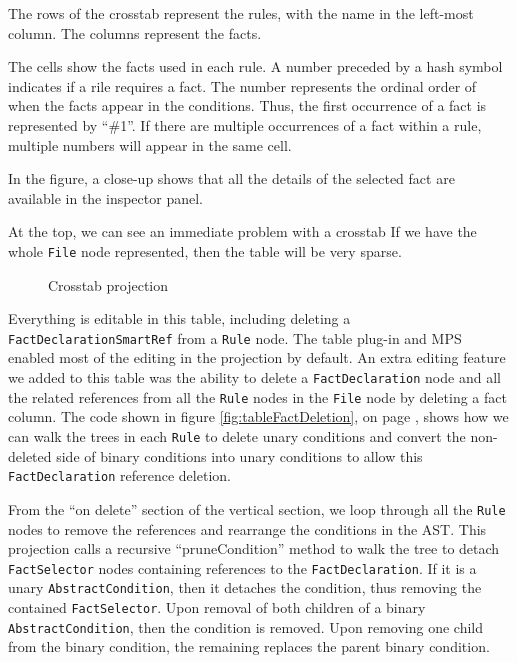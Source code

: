 The rows of the crosstab represent the rules, with the name in the left-most column.
The columns represent the facts.

The cells show the facts used in each rule.
A number preceded by a hash symbol indicates if a rile requires a fact.
The number represents the ordinal order of when the facts appear in the conditions.
Thus, the first occurrence of a fact is represented by ``\#1''.
If there are multiple occurrences of a fact within a rule, multiple numbers will appear in the same cell.

In the figure, a close-up shows that all the details of the selected fact are available in the inspector panel.

At the top, we can see an immediate problem with a crosstab
If we have the whole \texttt{File} node represented, then the table will be very sparse.

\begin{figure}
    \centering
    \caption{Crosstab projection}
    \label{fig:crosstabProjection1}
\end{figure}

Everything is editable in this table, including deleting a \texttt{FactDeclarationSmartRef} from a \texttt{Rule} node.
The table plug-in and MPS enabled most of the editing in the projection by default.
An extra editing feature we added to this table was the ability to delete a \texttt{FactDeclaration} node and all the related references from all the \texttt{Rule} nodes in the \texttt{File} node by deleting a fact column.
The code shown in figure \ref{fig:tableFactDeletion}, on page \pageref{fig:tableFactDeletion}, shows how we can walk the trees in each \texttt{Rule} to delete unary conditions and convert the non-deleted side of binary conditions into unary conditions to allow this \texttt{FactDeclaration} reference deletion.

From the ``on delete'' section of the vertical section, we loop through all the \texttt{Rule} nodes to remove the references and rearrange the conditions in the AST.
This projection calls a recursive ``pruneCondition'' method to walk the tree to detach \texttt{FactSelector} nodes containing references to the \texttt{FactDeclaration}.
If it is a unary \texttt{AbstractCondition}, then it detaches the condition, thus removing the contained \texttt{FactSelector}.
Upon removal of both children of a binary \texttt{AbstractCondition}, then the condition is removed.
Upon removing one child from the binary condition, the remaining replaces the parent binary condition.


